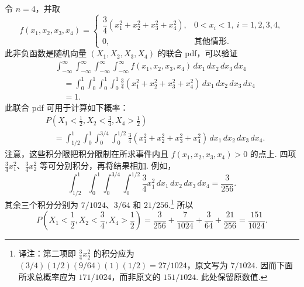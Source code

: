 \begin{example}[多元 pdf]\label{ex:4.6.1}
令 $n=4$，并取
$$f(x_1,x_2,x_3,x_4)=\begin{cases}\dfrac34(x_1^2+x_2^2+x_3^2+x_4^2),&0<x_i<1,\ i=1,2,3,4,\\0,&\text{其他情形}.\end{cases}$$
此非负函数是随机向量 $(X_1,X_2,X_3,X_4)$ 的联合 pdf，可以验证
$$\begin{aligned}
&\int_{-\infty}^{\infty}\int_{-\infty}^{\infty}\int_{-\infty}^{\infty}\int_{-\infty}^{\infty}f(x_1,x_2,x_3,x_4)\,dx_1\,dx_2\,dx_3\,dx_4\\
&\quad=\int_0^1\int_0^1\int_0^1\int_0^1\frac34(x_1^2+x_2^2+x_3^2+x_4^2)\,dx_1\,dx_2\,dx_3\,dx_4\\
&\quad=1.
\end{aligned}$$
此联合 pdf 可用于计算如下概率：
$$\begin{aligned}
&P\left(X_1<\frac12,X_2<\frac34,X_4>\frac12\right)\\
&\quad=\int_{1/2}^1\int_0^1\int_0^{3/4}\int_0^{1/2}\frac34(x_1^2+x_2^2+x_3^2+x_4^2)\,dx_1\,dx_2\,dx_3\,dx_4.
\end{aligned}$$
注意，这些积分限把积分限制在所求事件内且 $f(x_1,x_2,x_3,x_4)>0$ 的点上. 四项 $\frac34x_1^2$、$\frac34x_2^2$ 等可分别积分，再将结果相加. 例如，
$$\int_{1/2}^1\int_0^1\int_0^{3/4}\int_0^{1/2}\frac34x_1^2\,dx_1\,dx_2\,dx_3\,dx_4=\frac3{256}.$$
其余三个积分分别为 $7/1024$、$3/64$ 和 $21/256$.\footnote{译注：第二项即 $\frac34x_2^2$ 的积分应为 $(3/4)(1/2)(9/64)(1)(1/2)=27/1024$，原文写为 $7/1024$. 因而下面所求总概率应为 $171/1024$，而非原文的 $151/1024$. 此处保留原数值.} 所以
$$P\left(X_1<\frac12,X_2<\frac34,X_4>\frac12\right)=\frac3{256}+\frac7{1024}+\frac3{64}+\frac{21}{256}=\frac{151}{1024}.$$


\end{example}
